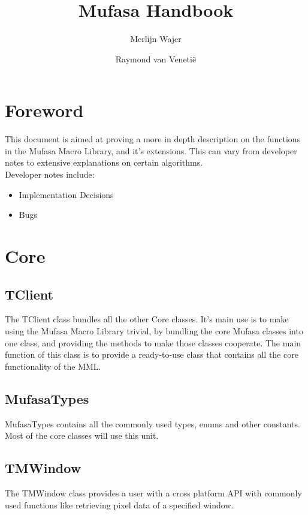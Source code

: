 \documentclass[a4paper]{report}
\begin{document}
\title{Mufasa Handbook}
\author{Merlijn Wajer \and Raymond van Veneti\"{e}}

\maketitle
\tableofcontents

\chapter{Foreword}

This document is aimed at proving a more in depth description on the
functions in the Mufasa Macro Library, and it's extensions.
This can vary from developer notes to extensive explanations on certain
algorithms. \\
Developer notes include:
\begin{itemize}
	\item Implementation Decisions
	\item Bugs
\end{itemize}

\chapter{Core}

\section{TClient}

The TClient class bundles all the other Core classes.
It's main use is to make using the Mufasa Macro Library trivial, by bundling
the core Mufasa classes into one class, and providing the methods to make those
classes cooperate. The main function of this class is to provide a
ready-to-use class that contains all the core functionality of the MML.

\section{MufasaTypes}

MufasaTypes contains all the commonly used types, enums and other constants.
Most of the core classes will use this unit.

\section{TMWindow}

The TMWindow class provides a user with a cross platform API with commonly used
functions like retrieving pixel data of a specified window.
\end{document}
